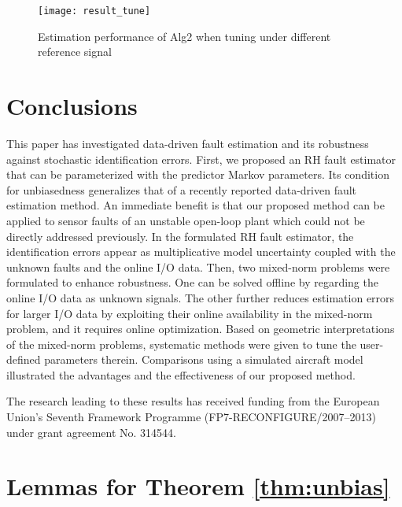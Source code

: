 \documentclass[twocolumn]{autart}
\begin{document}
\begin{figure}[h]
\centering
\texttt{[image: result\_tune]}
\caption{Estimation performance of Alg2 when tuning  under different reference signal }
\label{fig:result_tune}
\end{figure}










\section{Conclusions}
This paper has investigated data-driven fault estimation and its robustness against stochastic identification errors. First, we proposed an RH fault estimator that can be parameterized with the predictor Markov parameters. Its condition for unbiasedness generalizes that of a recently reported data-driven fault estimation method. An immediate benefit is that our proposed method can be applied to sensor faults of an unstable open-loop plant which could not be directly addressed previously. In the formulated RH fault estimator, the identification errors appear as multiplicative model uncertainty coupled with the unknown faults and the online I/O data. Then, two mixed-norm problems were formulated to enhance robustness. One can be solved offline by regarding the online I/O data as unknown signals. The other further reduces estimation errors for larger I/O data by exploiting their online availability in the mixed-norm problem, and it requires online optimization. Based on geometric interpretations of the mixed-norm problems, systematic methods were given to tune the user-defined parameters therein. 
Comparisons using a simulated aircraft model illustrated the advantages and the effectiveness of our proposed method.




\begin{ack}                               The research leading to these results has received funding from the European Union's Seventh Framework Programme (FP7-RECONFIGURE/2007--2013) under grant agreement No. 314544.  \end{ack}

                   


\appendix
\section{Lemmas for Theorem \ref{thm:unbias}}\label{app:property}
\end{document}
